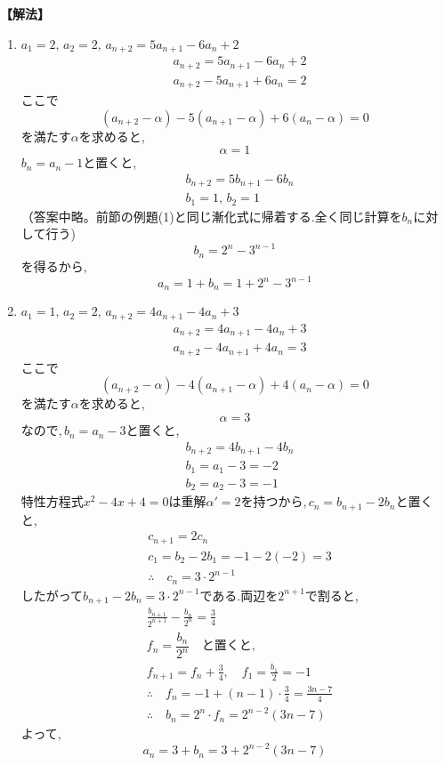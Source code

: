 \noindent\textbf{【解法】}
\begin{enumerate}[label=(\arabic*),parsep=3pt]
  \item $\displaystyle a_1=2,\,a_2=2,\, a_{n+2}=5a_{n+1}-6a_n+2$
        \begin{align*}
          &a_{n+2}=5a_{n+1}-6a_n+2\\
          &a_{n+2}-5a_{n+1}+6a_n=2
        \end{align*}
        ここで
        \[
          (a_{n+2}-\alpha)-5(a_{n+1}-\alpha)+6(a_n-\alpha)=0
        \]
        を満たす$\alpha$を求めると,
        \[
          \alpha=1
        \]
        $b_n=a_n-1$と置くと,
        \begin{align*}
           & b_{n+2}=5b_{n+1}-6b_n \\
           & b_1=1,\, b_2=1
        \end{align*}
        （答案中略。前節の例題(1)と同じ漸化式に帰着する.全く同じ計算を$b_n$に対して行う)
        \[
          b_n=2^n-3^{n-1}
        \]
        を得るから,
        \[
          a_n=1+b_n=1+2^n-3^{n-1}
        \]
  \item $\displaystyle a_1=1,\,a_2=2,\, a_{n+2}=4a_{n+1}-4a_n+3$
        \begin{align*}
          &a_{n+2}=4a_{n+1}-4a_n+3\\
          &a_{n+2}-4a_{n+1}+4a_n=3
        \end{align*}
        ここで
        \[
          (a_{n+2}-\alpha)-4(a_{n+1}-\alpha)+4(a_n-\alpha)=0
        \]
        を満たす$\alpha$を求めると,
        \[
          \alpha=3
        \]
        なので,\,$b_n=a_n-3$と置くと,
        \begin{align*}
           & b_{n+2}=4b_{n+1}-4b_n \\
           & b_1=a_1-3=-2          \\
           & b_2=a_2-3=-1
        \end{align*}
        特性方程式$x^2-4x+4=0$は重解$\alpha'=2$を持つから,\,$c_n=b_{n+1}-2b_n$と置くと,
        \begin{align*}
           & c_{n+1}=2c_n                       \\
           & c_1=b_2-2b_1=-1-2(-2)=3            \\
           & \therefore \quad c_n=3\cdot2^{n-1}
        \end{align*}
        したがって$b_{n+1}-2b_n=3\cdot2^{n-1}$である.両辺を$2^{n+1}$で割ると,
        \begin{align*}
           & \frac{b_{n+1}}{2^{n+1}}-\frac{b_n}{2^n}=\frac34          \\
           & f_n=\dfrac{b_n}{2^n} \quad \text{と置くと,}                       \\
           & f_{n+1}=f_n+\frac34,\quad f_1=\frac{b_1}{2}=-1           \\
           & \therefore \quad f_n=-1+(n-1)\cdot\frac34=\frac{3n-7}{4} \\
           & \therefore \quad b_n=2^n\cdot f_n=2^{n-2}(3n-7)
        \end{align*}
        よって,
        \[
          a_n=3+b_n=3+2^{n-2}(3n-7)
        \]
\end{enumerate}
